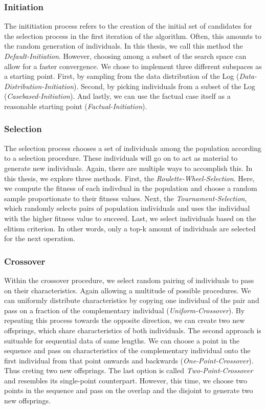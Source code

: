 \documentclass[./../../paper.tex]{subfiles}
\begin{document}
\subsubsection{Initiation}
The inititiation process refers to the creation of the initial set of candidates for the selection process in the first iteration of the algorithm. Often, this amounts to the random generation of individuals. In this thesis, we call this method the \emph{Default-Initiation}. However, choosing among a subset of the search space can allow for a faster convergence. We chose to implement three different subspaces as a starting point. First, by sampling from the data distribution of the Log (\emph{Data-Distribution-Initiation}). Second, by picking individuals from a subset of the Log (\emph{Casebased-Initiation}). And lastly, we can use the factual case itself as a reasonable starting point (\emph{Factual-Initiation}).

\subsubsection{Selection}
The selection process chooses a set of individuals among the population according to a selection procedure. These individuals will go on to act as material to generate new individuals. Again, there are multiple ways to accomplish this. In this thesis, we explore three methods. First, the \emph{Roulette-Wheel-Selection}. Here, we compute the fitness of each indivdual in the population and choose a random sample proportionate to their fitness values. Next, the \emph{Tournament-Selection}, which randomly selects pairs of population individuals and uses the individual with the higher fitness value to succeed. Last, we select individuals based on the elitism criterion. In other words, only a top-k amount of individuals are selected for the next operation.

\subsubsection{Crossover}
Within the crossover procedure, we select random pairing of individuals to pass on their characteristics. Again allowing a multitude of possible procedures. We can uniformly distribute characteristics by copying one individual of the pair and pass on a fraction of the complementary individual (\emph{Uniform-Crossover}). By repeating this process towards the opposite direction, we can create two new offsprings, which share characteristics of both individuals. The second approach is suituable for sequential data of same lengths. We can choose a point in the sequence and pass on characteristics of the complementary individual onto the first individual from that point onwards and backwards (\emph{One-Point-Crossover}). Thus creting two new offsprings. The last option is called \emph{Two-Point-Crossover} and resembles its single-point counterpart. However, this time, we choose two points in the sequence and pass on the overlap and the disjoint to generate two new offsprings.
\end{document}
